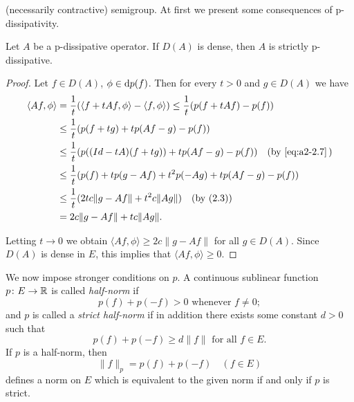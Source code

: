 (necessarily contractive) semigroup.
At first we present some consequences of p-dissipativity.
\begin{theorem}\label{thm:a2-2.7}
Let $A$ be a p-dissipative operator.
If $D(A)$ is dense, then $A$ is strictly p-dissipative.
\end{theorem}
\begin{proof}
Let $f \in D(A)$, $\phi \in \mathop{}\!\mathrm{d}{p}(f)$.
Then for every $t > 0$ and $g \in D(A)$ we have
\begin{align*}
\langle Af,\phi \rangle 
&= \frac{1}{t}(\langle f + tAf,\phi \rangle - \langle f,\phi \rangle) \leq \frac{1}{t}(p(f + tAf) - p(f)) \\
&\leq \frac{1}{t}(p(f + tg) + tp(Af - g) - p(f)) \\
&\leq \frac{1}{t}(p((Id - tA)(f + tg)) + tp(Af - g) - p(f)) \quad \text{(by \eqref{eq:a2-2.7}\,)} \\ %
&\leq \frac{1}{t}(p(f) + tp(g - Af) + t^2p(-Ag) + tp(Af - g) - p(f)) \\
&\leq \frac{1}{t}(2tc\|g - Af\| + t^2c\|Ag\|) \quad \text{(by (2.3))} \\
&= 2c\|g - Af\| + tc\|Ag\|.
\end{align*}

Letting $t \to 0$ we obtain $\langle Af,\phi \rangle \geq 2c\|g - Af\|$ for all $g \in D(A)$.
Since $D(A)$ is dense in $E$, this implies that $\langle Af,\phi \rangle \geq 0$.
\end{proof}

We now impose stronger conditions on $p$.
A continuous sublinear function $p \colon E \to \mathbb{R}$ is called \emph{half-norm} if
\begin{equation}\label{eq:a2-2.11}
p(f) + p(-f) > 0 \text{ whenever } f \neq 0;
\end{equation}
and $p$ is called a \emph{strict half-norm} if in addition there exists some constant $d > 0$ such that
\begin{equation}\label{eq:a2-2.12}
p(f) + p(-f) \geq d\|f\| \text{ for all } f \in E.
\end{equation}
If $p$ is a half-norm, then
\begin{equation}\label{eq:a2-2.13}
\|f\|_p = p(f) + p(-f) \quad (f \in E)
\end{equation}
defines a norm on $E$ which is equivalent to the given norm if and only if $p$ is strict.

